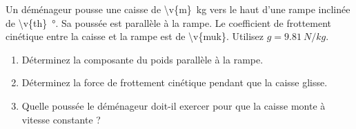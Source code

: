 Un déménageur pousse une caisse de \qty{\v{m}}{kg} vers le haut d'une rampe inclinée de \qty{\v{th}}{\degree}. Sa poussée est parallèle à la rampe. Le coefficient de frottement cinétique entre la caisse et la rampe est de \num{\v{muk}}. Utilisez $g = \qty{9.81}{N/kg}$.

\begin{enumerate}[label=\alph*)]
    \item Déterminez la composante du poids parallèle à la rampe.
    \item Déterminez la force de frottement cinétique pendant que la caisse glisse.
    \item Quelle poussée le déménageur doit-il exercer pour que la caisse monte à vitesse constante ?
\end{enumerate}
